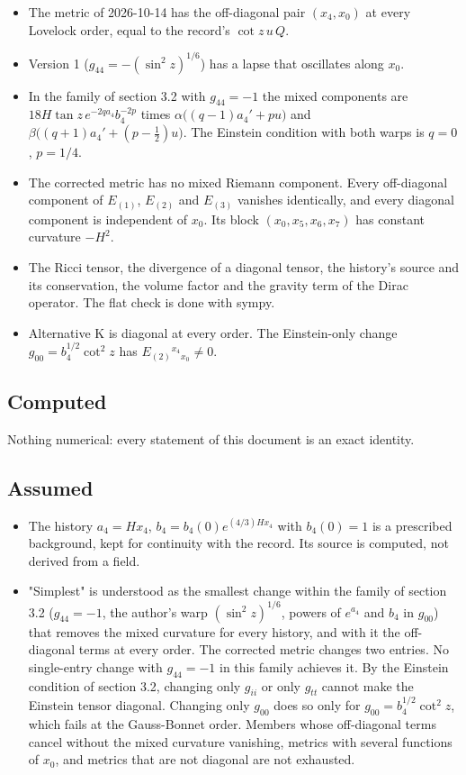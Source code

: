 \documentclass[11pt]{article}
\begin{document}
\begin{itemize}
\item The metric of 2026-10-14 has the off-diagonal pair $(x_4, x_0)$ at every Lovelock order, equal to the record's $\cot z\,u\,Q$.
\item Version 1 ($g_{44} = -(\sin^2 z)^{1/6}$) has a lapse that oscillates along $x_0$.
\item In the family of section 3.2 with $g_{44} = -1$ the mixed components are $18H\tan z\,e^{-2qa_4}b_4^{-2p}$ times $\alpha\big((q-1)a_4' + pu\big)$ and $\beta\big((q+1)a_4' + (p-\frac12)u\big)$. The Einstein condition with both warps is $q = 0$, $p = 1/4$.
\item The corrected metric has no mixed Riemann component. Every off-diagonal component of $E_{(1)}$, $E_{(2)}$ and $E_{(3)}$ vanishes identically, and every diagonal component is independent of $x_0$. Its block $(x_0, x_5, x_6, x_7)$ has constant curvature $-H^2$.
\item The Ricci tensor, the divergence of a diagonal tensor, the history's source and its conservation, the volume factor and the gravity term of the Dirac operator. The flat check is done with sympy.
\item Alternative K is diagonal at every order. The Einstein-only change $g_{00} = b_4^{1/2}\cot^2 z$ has $E_{(2)}{}^{x_4}{}_{x_0} \neq 0$.
\end{itemize}

\subsection{Computed}

Nothing numerical: every statement of this document is an exact identity.

\subsection{Assumed}

\begin{itemize}
\item The history $a_4 = Hx_4$, $b_4 = b_4(0)e^{(4/3)Hx_4}$ with $b_4(0) = 1$ is a prescribed background, kept for continuity with the record. Its source is computed, not derived from a field.
\item "Simplest" is understood as the smallest change within the family of section 3.2 ($g_{44} = -1$, the author's warp $(\sin^2 z)^{1/6}$, powers of $e^{a_4}$ and $b_4$ in $g_{00}$) that removes the mixed curvature for every history, and with it the off-diagonal terms at every order. The corrected metric changes two entries. No single-entry change with $g_{44} = -1$ in this family achieves it. By the Einstein condition of section 3.2, changing only $g_{ii}$ or only $g_{tt}$ cannot make the Einstein tensor diagonal. Changing only $g_{00}$ does so only for $g_{00} = b_4^{1/2}\cot^2 z$, which fails at the Gauss-Bonnet order. Members whose off-diagonal terms cancel without the mixed curvature vanishing, metrics with several functions of $x_0$, and metrics that are not diagonal are not exhausted.
\end{itemize}
\end{document}
